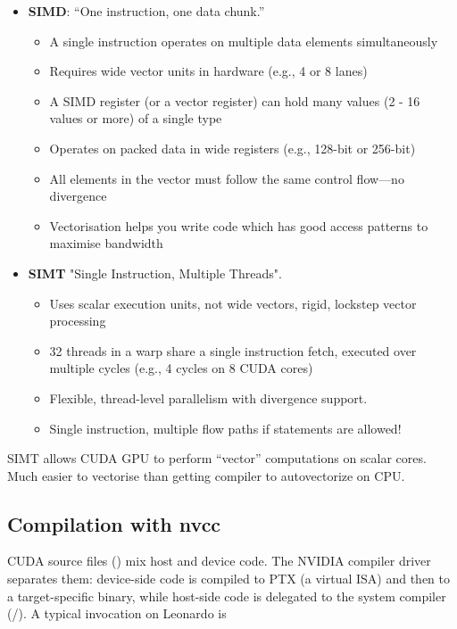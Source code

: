 \begin{itemize}
    \item \textbf{SIMD}: “One instruction, one data chunk.”
    \begin{itemize}
        \item A single instruction operates on multiple data elements simultaneously
        \item Requires wide vector units in hardware (e.g., 4 or 8 lanes)
        \item A SIMD register (or a vector register) can hold many values (2 - 16 values or more) of a single type
        \item Operates on packed data in wide registers (e.g., 128-bit or 256-bit)
        \item All elements in the vector must follow the same control flow—no divergence
        \item Vectorisation helps you write code which has good access patterns to maximise bandwidth
    \end{itemize}
    \item \textbf{SIMT} "Single Instruction, Multiple Threads".
    \begin{itemize}
        \item Uses scalar execution units, not wide vectors, rigid, lockstep vector processing
        \item 32 threads in a warp share a single instruction fetch, executed over multiple cycles (e.g., 4 cycles
        on 8 CUDA cores)
        \item Flexible, thread-level parallelism with divergence support.
        \item Single instruction, multiple flow paths
        if statements are allowed!
    \end{itemize}
\end{itemize}

SIMT allows CUDA GPU to perform “vector” computations on scalar cores. Much easier to vectorise than getting compiler to autovectorize on CPU.

\subsection{Compilation with nvcc}

CUDA source files () mix host and device code. The NVIDIA compiler driver  separates them: device-side code is compiled to PTX (a virtual ISA) and then to a target-specific binary, while host-side code is delegated to the system compiler (/). A typical invocation on Leonardo is

